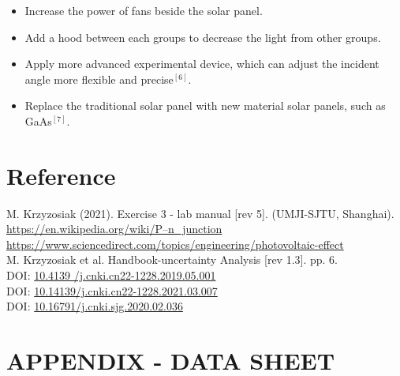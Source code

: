 \documentclass[a4paper]{article}
\begin{document}
\begin{itemize}
	\item Increase the power of fans beside the solar panel.
	\item Add a hood between each groups to decrease the light from other groups.
	\item Apply more advanced experimental device, which can adjust the incident angle more flexible and precise$^{[6]}$.
	\item Replace the traditional solar panel with new material solar panels, such as GaAs$^{[7]}$.
\end{itemize}



\newpage
\section{Reference}
\noindent [1] M. Krzyzosiak (2021). Exercise 3 - lab manual [rev 5]. (UMJI-SJTU, Shanghai). \\
\noindent [2] \url{https://en.wikipedia.org/wiki/P–n_junction} \\
\noindent [3] \url{https://www.sciencedirect.com/topics/engineering/photovoltaic-effect} \\
\noindent [4] M. Krzyzosiak et al. Handbook-uncertainty Analysis [rev 1.3]. pp. 6. \\
\noindent [5] DOI: \url{10.4139 /j.cnki.cn22-1228.2019.05.001} \\
\noindent [6] DOI: \url{10.14139/j.cnki.cn22-1228.2021.03.007}  \\
\noindent [7] DOI: \url{10.16791/j.cnki.sjg.2020.02.036}


\newpage
\section*{APPENDIX - DATA SHEET}




\end{document}
